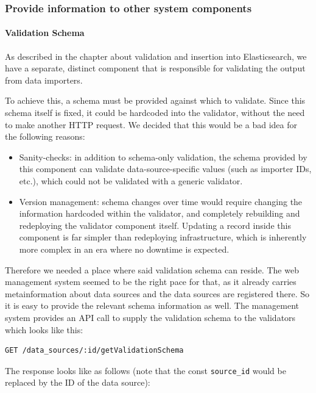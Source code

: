 \subsubsection{Provide information to other system
components}\label{provide-information-to-other-system-components}

\paragraph{Validation Schema}\label{validation-schema}

As described in the chapter about validation and insertion into
Elasticsearch, we have a separate, distinct component that is
responsible for validating the output from data importers.

To achieve this, a schema must be provided against which to validate.
Since this schema itself is fixed, it could be hardcoded into the
validator, without the need to make another HTTP request. We decided
that this would be a bad idea for the following reasons:

\begin{itemize}
\tightlist
\item
  Sanity-checks: in addition to schema-only validation, the schema
  provided by this component can validate data-source-specific values
  (such as importer IDs, etc.), which could not be validated with a
  generic validator.
\item
  Version management: schema changes over time would require changing
  the information hardcoded within the validator, and completely
  rebuilding and redeploying the validator component itself. Updating a
  record inside this component is far simpler than redeploying
  infrastructure, which is inherently more complex in an era where no
  downtime is expected.
\end{itemize}

Therefore we needed a place where said validation schema can reside. The
web management system seemed to be the right pace for that, as it
already carries metainformation about data sources and the data sources
are registered there. So it is easy to provide the relevant schema
information as well. The management system provides an API call to
supply the validation schema to the validators which looks like this:

\begin{verbatim}
GET /data_sources/:id/getValidationSchema
\end{verbatim}

The response looks like as follows (note that the const
\texttt{source\_id} would be replaced by the ID of the data source):

